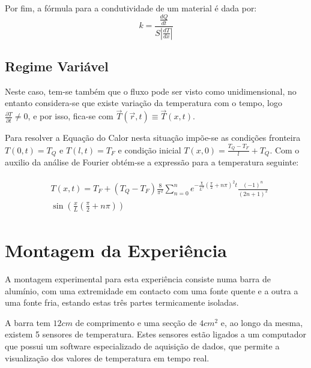 \documentclass[9pt]{extarticle}
\begin{document}
\begin{multicols}{2}
Por fim, a fórmula para a condutividade de um material é dada por:
\begin{equation}
k = \frac{\frac{dQ}{dt}}{S|\frac{dT}{dx}|}
\end{equation}
\begin{center}
\par{}
\end{center}

\subsection*{Regime Variável}
Neste caso, tem-se também que o fluxo pode ser visto como unidimensional, no entanto considera-se que existe variação da temperatura com o tempo, logo $\frac{\partial T}{\partial t} \neq 0$, e por isso, fica-se com  $\vec{T}(\vec{r},t) \equiv \vec{T}(x,t)$.

\par Para resolver a Equação do Calor nesta situação impõe-se as condições fronteira $T(0,t) = T_{Q}$ e $T(l,t) = T_{F}$ e condição inicial $T(x,0) = \frac{T_{Q} - T_{F}}{l} + T_{Q}$. Com o auxilio da análise de Fourier obtém-se a expressão para a temperatura seguinte:

\begin{eqnarray}
\begin{split}
& T(x,t)= T_{F} + (T_{Q} - T_{F})\frac{8}{\pi ^2}\sum_{n=0}^{n} e^{-\frac{\chi}{L^2}(\frac{\pi}{2} + n\pi)^2 t}  \frac{(-1)^n}{(2n+1)^2} \\
&\sin \left(\frac{x}{L}\left(\frac{\pi}{2} + n\pi \right)\right)
\end{split}
\end{eqnarray}

\section{Montagem da Experiência}

\par A montagem experimental para esta experiência consiste numa barra de alumínio, com uma extremidade em contacto com uma fonte quente e a outra a uma fonte fria, estando estas três partes termicamente isoladas.
\par A barra tem $12cm$ de comprimento e uma secção de $4cm^2$ e, ao longo da mesma, existem 5 sensores de temperatura. Estes sensores estão ligados a um computador que possui um software especializado de aquisição de dados, que permite a visualização dos valores de temperatura em tempo real.


\end{multicols}
\end{document}
